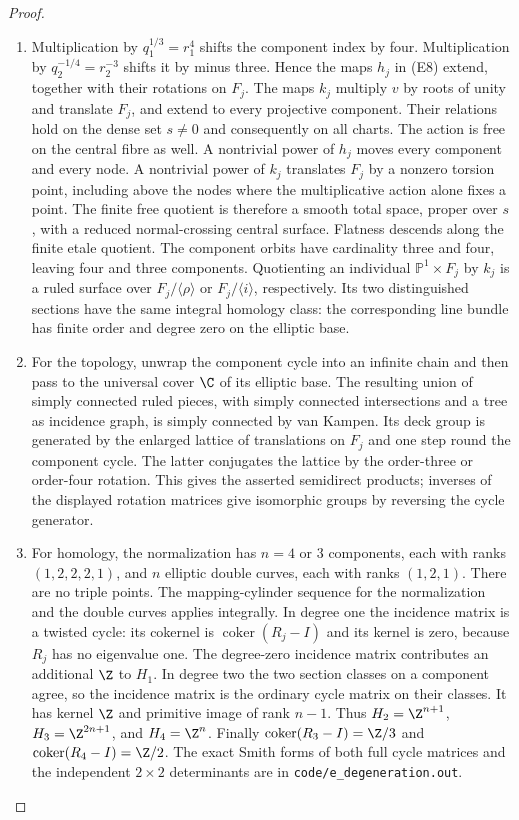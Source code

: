 \begin{proof}
\begin{enumerate}[label=\arabic*.,leftmargin=*]
\item Multiplication by $q_1^{1/3}=r_1^4$ shifts the component index by four.
Multiplication by $q_2^{-1/4}=r_2^{-3}$ shifts it by minus three.
Hence the maps $h_j$ in (E8) extend, together with their rotations
on $F_j$. The maps $k_j$ multiply $v$ by roots of unity and translate
$F_j$, and extend to every projective component. Their relations
hold on the dense set $s\ne0$ and consequently on all charts.
The action is free on the central fibre as well. A nontrivial power
of $h_j$ moves every component and every node. A nontrivial power
of $k_j$ translates $F_j$ by a nonzero torsion point, including
above the nodes where the multiplicative action alone fixes a point.
The finite free quotient is therefore a smooth total space, proper
over $s$, with a reduced normal-crossing central surface. Flatness
descends along the finite etale quotient. The component orbits have
cardinality three and four, leaving four and three components.
Quotienting an individual $\mathbb P^1\times F_j$ by $k_j$ is a
ruled surface over $F_j/\langle\rho\rangle$ or
$F_j/\langle i\rangle$, respectively. Its two distinguished
sections have the same integral homology class: the corresponding
line bundle has finite order and degree zero on the elliptic base.

\item For the topology, unwrap the component cycle into an infinite chain
and then pass to the universal cover $\C$ of its elliptic base.
The resulting union of simply connected ruled pieces, with
simply connected intersections and a tree as incidence graph, is
simply connected by van Kampen. Its deck group is generated by
the enlarged lattice of translations on $F_j$ and one step round
the component cycle. The latter conjugates the lattice by the
order-three or order-four rotation. This gives the asserted
semidirect products; inverses of the displayed rotation matrices
give isomorphic groups by reversing the cycle generator.

\item For homology, the normalization has $n=4$ or $3$ components, each
with ranks $(1,2,2,2,1)$, and $n$ elliptic double curves, each with
ranks $(1,2,1)$. There are no triple points. The mapping-cylinder
sequence for the normalization and the double curves applies
integrally. In degree one the incidence matrix is a twisted cycle:
its cokernel is $\operatorname{coker}(R_j-I)$ and its kernel is
zero, because $R_j$ has no eigenvalue one. The degree-zero incidence
matrix contributes an additional $\Z$ to $H_1$. In degree two the
two section classes on a component agree, so the incidence matrix
is the ordinary cycle matrix on their classes. It has kernel
$\Z$ and primitive image of rank $n-1$. Thus $H_2=\Z^{n+1}$,
$H_3=\Z^{2n+1}$, and $H_4=\Z^n$. Finally
$\operatorname{coker}(R_3-I)=\Z/3$ and
$\operatorname{coker}(R_4-I)=\Z/2$. The exact Smith forms of both
full cycle matrices and the independent $2\times2$ determinants
are in \texttt{code/e\_degeneration.out}.
\end{enumerate}
\end{proof}








